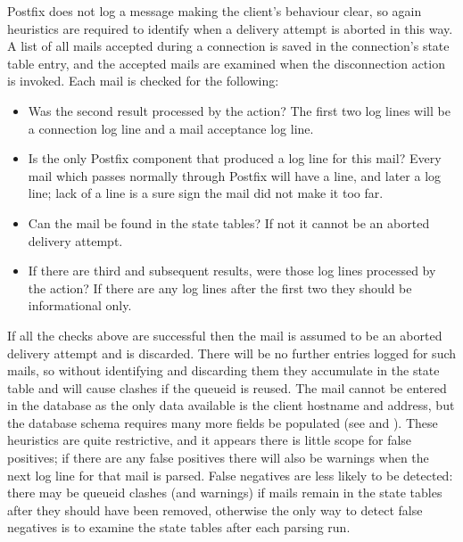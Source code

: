 Postfix does not log a message making the client's behaviour clear, so
again heuristics are required to identify when a delivery attempt is
aborted in this way.  A list of all mails accepted during a connection is
saved in the connection's state table entry, and the accepted mails are
examined when the disconnection action is invoked.  Each mail is checked
for the following:

\begin{itemize}

    \item Was the second result processed by the  action?
        The first two  log lines will be a connection log
        line and a mail acceptance log line.

    \item Is  the only Postfix component that produced a log
        line for this mail?  Every mail which passes normally through
        Postfix will have a  line, and later a
         log line; lack of a  line is a sure
        sign the mail did not make it too far.

    \item Can the mail be found in the state tables?  If not it cannot be
        an aborted delivery attempt.

    \item If there are third and subsequent results, were those log lines
        processed by the  action?  If there are any log
        lines after the first two they should be informational only.

\end{itemize}

If all the checks above are successful then the mail is assumed to be an
aborted delivery attempt and is discarded.  There will be no further
entries logged for such mails, so without identifying and discarding them
they accumulate in the state table and will cause clashes if the queueid is
reused.  The mail cannot be entered in the database as the only data
available is the client hostname and  address, but the database
schema requires many more fields be populated (see  and ).  These heuristics are quite
restrictive, and it appears there is little scope for false positives; if
there are any false positives there will also be warnings when the next log
line for that mail is parsed.  False negatives are less likely to be
detected: there may be queueid clashes (and warnings) if mails remain in
the state tables after they should have been removed, otherwise the only
way to detect false negatives is to examine the state tables after each
parsing run.

